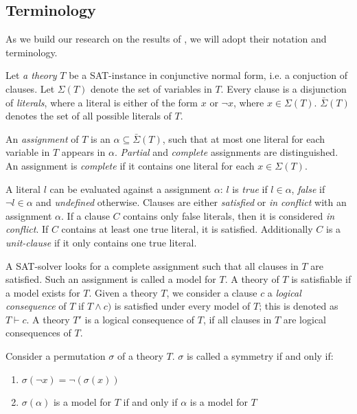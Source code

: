 		\subsection{Terminology}
			As we build our research on the results of \cite{devriendt2012symmetry}, we will adopt
			their notation and terminology.

			Let \emph{a theory} $T$ be a SAT-instance in conjunctive normal form, i.e. a conjuction
			of clauses.
			Let $\Sigma(T)$ denote the set of variables in $T$.
			Every clause is a disjunction of \emph{literals}, where a literal is either of the form
			$x$ or $\neg x$, where $x \in \Sigma(T)$.
			$\bar\Sigma(T)$ denotes the set of all possible literals of $T$.

			An \emph{assignment} of $T$ is an $\alpha \subseteq \bar\Sigma(T)$, such that at most
			one literal for each variable in $T$ appears in $\alpha$.
			\emph{Partial} and \emph{complete} assignments are distinguished.
			An assignment is \emph{complete} if it contains one literal for each $x \in \Sigma(T)$.

			A literal $l$ can be evaluated against a assignment $\alpha$: $l$ is \emph{true} if $l \in
			\alpha$, \emph{false} if $\neg l \in \alpha$ and \emph{undefined} otherwise.
			Clauses are either \emph{satisfied} or \emph{in conflict} with an assignment $\alpha$.
			If a clause $C$ contains only false literals, then it is considered \emph{in conflict}.
			If $C$ contains at least one true literal, it is satisfied.
			Additionally $C$ is a \emph{unit-clause} if it only contains one true literal.

			A SAT-solver looks for a complete assignment such that all clauses in $T$ are satisfied.
			Such an assignment is called a model for $T$.
			A theory of $T$ is satisfiable if a model exists for $T$.
			Given a theory $T$, we consider a clause $c$ a \emph{logical consequence} of $T$ if
			$T \wedge c)$ is satisfied under every model of $T$; this is denoted as $T \vdash c$.
			A theory $T'$ is a logical consequence of $T$, if all clauses in $T$ are logical
			consequences of $T$.



				Consider a permutation $\sigma$ of a theory $T$.
				$\sigma$ is called a symmetry if and only if:

				\begin{enumerate}
					\item $\sigma(\neg x) = \neg(\sigma( x ))$
					\item $\sigma(\alpha )$ is a model for $T$ if and only if $\alpha$ is a model for
						$T$
				\end{enumerate}

